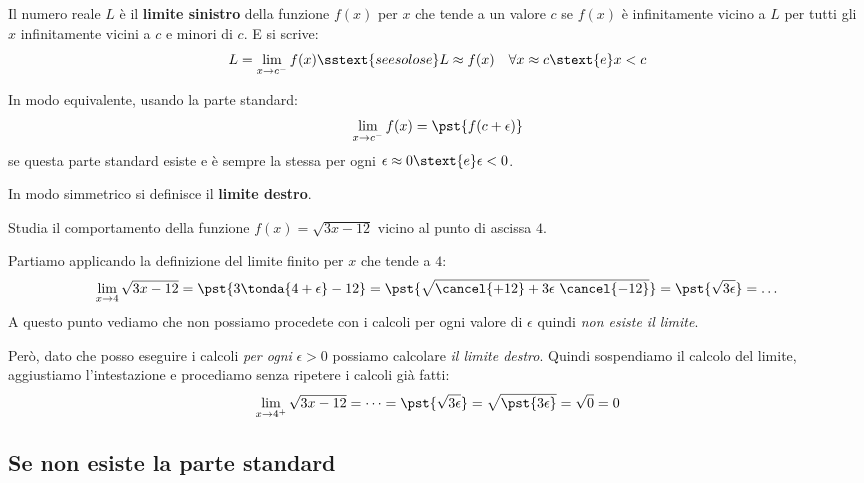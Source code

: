 \begin{definizione}
Il numero reale \(L\) è il \textbf{limite sinistro} della funzione \(f(x)\) 
per \(x\) che tende a un valore \(c\) se \(f(x)\) è infinitamente vicino a 
\(L\) per tutti gli \(x\) infinitamente vicini a \(c\) e minori di 
\(c\). \quad 
E si scrive:
\[L = \lim_{x \rightarrow c^-} f(x) \sstext{se e solo se} 
L \approx {f(x)} \quad 
\forall x \approx c \stext{ e } x < c\]

In modo equivalente, usando la parte standard: 
\[\lim_{x \to c^-} f(x) = \pst{f(c+\epsilon)}\]
se questa parte standard esiste e è sempre la stessa 
per ogni \(\epsilon \approx 0 \stext{ e } \epsilon < 0\).
\end{definizione}
In modo simmetrico si definisce il \textbf{limite destro}.

\begin{esempio}
Studia il comportamento della funzione \(f(x)=\sqrt{3x-12}\) 
vicino al punto di ascissa \(4\).


Partiamo applicando la definizione del limite finito per \(x\) che tende a 
\(4\):
\[\lim_{x \to 4}\sqrt{3x-12} = \pst{3\tonda{4+\epsilon}-12} = 
\pst{\sqrt{\cancel{+12}+3 \epsilon~\cancel{-12}}} = 
\pst{\sqrt{3 \epsilon}} = \dots\]
A questo punto vediamo che non possiamo procedete con i calcoli per ogni 
valore di \(\epsilon\) quindi \emph{non esiste il limite}.

Però, dato che posso eseguire i calcoli \emph{per ogni} \(\epsilon > 0\) 
possiamo calcolare \emph{il limite destro}. 
Quindi sospendiamo il calcolo del limite, 
aggiustiamo l'intestazione e procediamo senza ripetere i calcoli già fatti:
\[\lim_{x \to 4^+}\sqrt{3x-12} = \dots =
\pst{\sqrt{3 \epsilon}} = 
\sqrt{\pst{3 \epsilon}} = \sqrt{0} = 0\]
\end{esempio}

\subsection{Se non esiste la parte standard}
\label{subsec:cont_limiti_nonsempreesiste}

